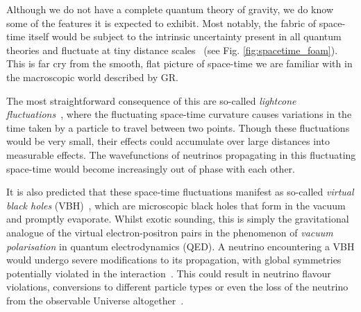 \documentclass[a4paper,11pt]{article}
\begin{document}

Although we do not have a complete quantum theory of gravity, we do know some of the features it is expected to exhibit. Most notably, the fabric of space-time itself would be subject to the intrinsic uncertainty present in all quantum theories and fluctuate at tiny distance scales~\cite{PhysRev.97.511, Hawking} (see Fig. \ref{fig:spacetime_foam}). This is far cry from the smooth, flat picture of space-time we are familiar with in the macroscopic world described by GR. 

The most straightforward consequence of this are so-called \textit{lightcone fluctuations}~\cite{PauliLightcone, Ford1999, gr-qc/9909085, Ellis:1999jf}, where the fluctuating space-time curvature causes variations in the time taken by a particle to travel between two points. Though these fluctuations would be very small, their effects could accumulate over large distances into measurable effects. The wavefunctions of neutrinos propagating in this fluctuating space-time would become increasingly out of phase with each other.

It is also predicted that these space-time fluctuations manifest as so-called \textit{virtual black holes} (VBH)~\cite{Hawking1982,PhysRevD.53.3099}, which are microscopic black holes that form in the vacuum and promptly evaporate. Whilst exotic sounding, this is simply the gravitational analogue of the virtual electron-positron pairs in  the phenomenon of \textit{vacuum polarisation} in quantum electrodynamics (QED). A neutrino encountering a VBH would undergo severe modifications to its propagation, with global symmetries potentially violated in the interaction~\cite{Anchordoqui:2005gj, Harlow:2018jwu, PhysRevD.102.115003, Hellmann:2021jyz}. This could result in neutrino flavour violations, conversions to different particle types or even the loss of the neutrino from the observable Universe altogether~\cite{Anchordoqui:2005gj, Anchordoqui:2006xv, Witten:2017hdv}.
\end{document}
